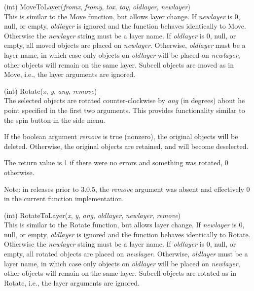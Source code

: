 \begin{description}
\item{(int) \vt MoveToLayer({\it fromx\/}, {\it fromy\/}, {\it tox\/},
 {\it toy\/}, {\it oldlayer\/}, {\it newlayer\/})}\\
This is similar to the {\vt Move} function, but allows layer change. 
If {\it newlayer} is 0, null, or empty, {\it oldlayer} is ignored and
the function behaves identically to {\vt Move}.  Otherwise the {\it
newlayer} string must be a layer name.  If {\it oldlayer} is 0, null,
or empty, all moved objects are placed on {\it newlayer\/}. 
Otherwise, {\it oldlayer} must be a layer name, in which case only
objects on {\it oldlayer} will be placed on {\it newlayer\/}, other
objects will remain on the same layer.  Subcell objects are moved as
in {\vt Move}, i.e., the layer arguments are ignored.

\item{(int) \vt Rotate({\it x\/}, {\it y\/}, {\it ang\/}, {\it remove\/})}\\
The selected objects are rotated counter-clockwise by {\it ang\/} (in
degrees) about he point specified in the first two arguments.  This
provides functionality similar to the {\cb spin} button in the side
menu.

If the boolean argument {\it remove} is true (nonzero), the original
objects will be deleted.  Otherwise, the original objects are
retained, and will become deselected.

The return value is 1 if there were no errors and something was
rotated, 0 otherwise.

Note:  in releases prior to 3.0.5, the {\it remove} argument was 
absent and effectively 0 in the current function implementation.

\item{(int) \vt RotateToLayer({\it x\/}, {\it y\/}, {\it ang\/},
 {\it oldlayer\/}, {\it newlayer\/}, {\it remove\/})}\\
This is similar to the {\vt Rotate} function, but allows layer change. 
If {\it newlayer} is 0, null, or empty, {\it oldlayer} is ignored and
the function behaves identically to {\vt Rotate}.  Otherwise the {\it
newlayer} string must be a layer name.  If {\it oldlayer} is 0, null,
or empty, all rotated objects are placed on {\it newlayer\/}. 
Otherwise, {\it oldlayer} must be a layer name, in which case only
objects on {\it oldlayer} will be placed on {\it newlayer\/}, other
objects will remain on the same layer.  Subcell objects are rotated as
in {\vt Rotate}, i.e., the layer arguments are ignored.


\end{description}
